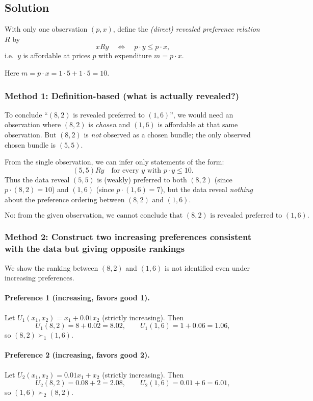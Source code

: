 \documentclass[12pt]{article}
\newcommand{\dotp}{\cdot}
\begin{document}
\subsection*{Solution}
With only one observation \((p,x)\), define the \emph{(direct) revealed preference relation} \(R\) by
\[
xR y \quad\Longleftrightarrow\quad p\dotp y \le p\dotp x,
\]
i.e.\ \(y\) is affordable at prices \(p\) with expenditure \(m=p\dotp x\).

Here \(m=p\dotp x=1\cdot 5+1\cdot 5=10\).

\subsubsection*{Method 1: Definition-based (what is actually revealed?)}
To conclude ``\((8,2)\) is revealed preferred to \((1,6)\)'', we would need an observation where \((8,2)\) is \emph{chosen} and \((1,6)\) is affordable at that same observation.
But \((8,2)\) is \emph{not} observed as a chosen bundle; the only observed chosen bundle is \((5,5)\).

From the single observation, we can infer only statements of the form:
\[
(5,5)R y \quad \text{for every }y\text{ with } p\dotp y\le 10.
\]
Thus the data reveal \((5,5)\) is (weakly) preferred to both \((8,2)\) (since \(p\dotp(8,2)=10\)) and \((1,6)\) (since \(p\dotp(1,6)=7\)),
but the data reveal \emph{nothing} about the preference ordering between \((8,2)\) and \((1,6)\).

\[
\boxed{\text{No: from the given observation, we cannot conclude that }(8,2)\text{ is revealed preferred to }(1,6).}
\]

\subsubsection*{Method 2: Construct two increasing preferences consistent with the data but giving opposite rankings}
We show the ranking between \((8,2)\) and \((1,6)\) is not identified even under increasing preferences.

\paragraph{Preference 1 (increasing, favors good 1).}
Let \(U_1(x_1,x_2)=x_1+0.01x_2\) (strictly increasing).
Then
\[
U_1(8,2)=8+0.02=8.02,\qquad U_1(1,6)=1+0.06=1.06,
\]
so \((8,2)\succ_1(1,6)\).

\paragraph{Preference 2 (increasing, favors good 2).}
Let \(U_2(x_1,x_2)=0.01x_1+x_2\) (strictly increasing).
Then
\[
U_2(8,2)=0.08+2=2.08,\qquad U_2(1,6)=0.01+6=6.01,
\]
so \((1,6)\succ_2(8,2)\).
\end{document}
